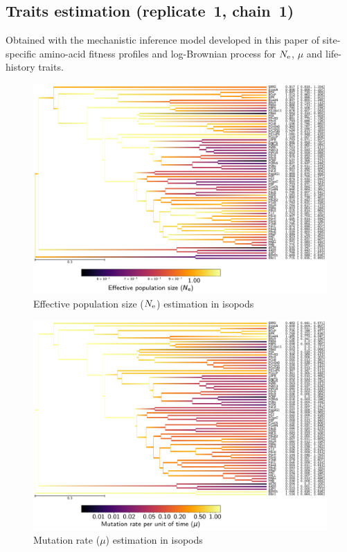 \documentclass{article}
\begin{document}
	\subsection{Traits estimation (replicate~1, chain~1)}
	Obtained with the mechanistic inference model developed in this paper of site-specific amino-acid fitness profiles and log-Brownian process for $\Ne$, $\mu$ and life-history traits.

	\begin{figure}[H]
		\centering
		\includegraphics[width=\linewidth, page=1]{isopods/12CDS_SiteMutSelBranchNe_R1_LogPopulationSize}
		\caption[$\Ne$ estimation in isopods]{Effective population size ($\Ne$) estimation in isopods}
	\end{figure}

	\begin{figure}[H]
		\centering
		\includegraphics[width=\linewidth, page=1]{isopods/12CDS_SiteMutSelBranchNe_R1_LogMutationRatePerTime}
		\caption[Mutation rate estimation in isopods]{Mutation rate ($\mu$) estimation in isopods}
	\end{figure}
\end{document}
